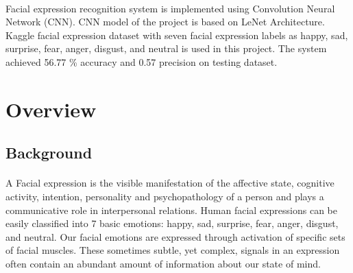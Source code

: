 \documentclass[a4paper,12pt,oneside]{article}
\begin{document}
\paragraph{}
﻿Facial expression recognition system is implemented using Convolution Neural Network
(CNN). CNN model of the project is based on LeNet Architecture. Kaggle facial expression
dataset with seven facial expression labels as happy, sad, surprise, fear, anger, disgust, and
neutral is used in this project. The system achieved 56.77 \% accuracy and 0.57 precision on
testing dataset.
\setlength{\baselineskip}{1.0\baselineskip}

\newpage
\begin{center}
\tableofcontents
\end{center}

\newpage
\thispagestyle{plain}
\begin{center}
\vspace{5mm}
\listoffigures
\vspace{5mm}
\end{center}


\newpage
\rfoot{\thepage}



\rfoot{\thepage}

\renewcommand{\headrulewidth}{0.0pt}
\renewcommand{\footrulewidth}{0.0pt}

\section{Overview}
\subsection{Background}
\paragraph{}
A Facial expression is the visible manifestation of the affective state, cognitive activity, intention, personality and psychopathology of a person and plays a communicative role in interpersonal relations. Human facial expressions can be easily classified into 7 basic emotions: happy, sad, surprise, fear, anger, disgust, and neutral. Our facial emotions are expressed through activation of specific sets of facial muscles. These sometimes subtle, yet complex, signals in an expression often contain an abundant amount of information about our state of mind.  
\end{document}
